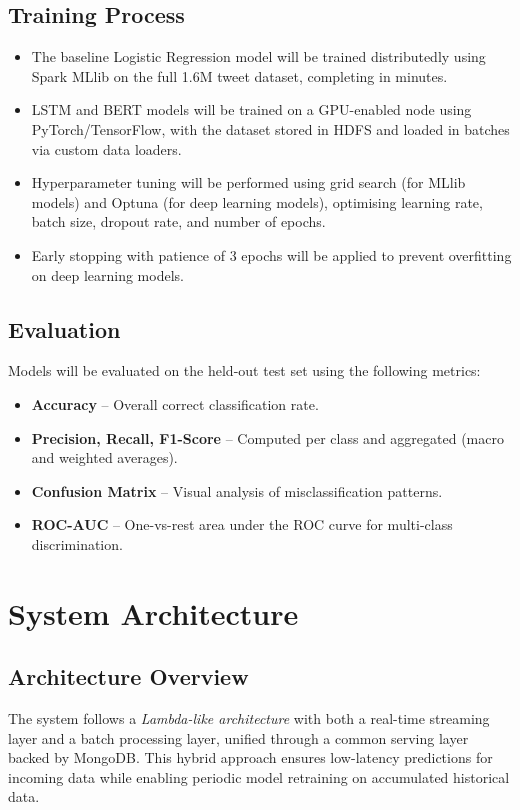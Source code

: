 \documentclass[conference]{IEEEtran}
\begin{document}
\subsection{Training Process}
\begin{itemize}[leftmargin=*]
    \item The baseline Logistic Regression model will be trained distributedly using Spark MLlib on the full 1.6M tweet dataset, completing in minutes.
    \item LSTM and BERT models will be trained on a GPU-enabled node using PyTorch/TensorFlow, with the dataset stored in HDFS and loaded in batches via custom data loaders.
    \item Hyperparameter tuning will be performed using grid search (for MLlib models) and Optuna (for deep learning models), optimising learning rate, batch size, dropout rate, and number of epochs.
    \item Early stopping with patience of 3 epochs will be applied to prevent overfitting on deep learning models.
\end{itemize}

\subsection{Evaluation}
Models will be evaluated on the held-out test set using the following metrics:
\begin{itemize}[leftmargin=*]
    \item \textbf{Accuracy} -- Overall correct classification rate.
    \item \textbf{Precision, Recall, F1-Score} -- Computed per class and aggregated (macro and weighted averages).
    \item \textbf{Confusion Matrix} -- Visual analysis of misclassification patterns.
    \item \textbf{ROC-AUC} -- One-vs-rest area under the ROC curve for multi-class discrimination.
\end{itemize}

\section{System Architecture}

\subsection{Architecture Overview}
The system follows a \textit{Lambda-like architecture} with both a real-time streaming layer and a batch processing layer, unified through a common serving layer backed by MongoDB. This hybrid approach ensures low-latency predictions for incoming data while enabling periodic model retraining on accumulated historical data.
\end{document}
